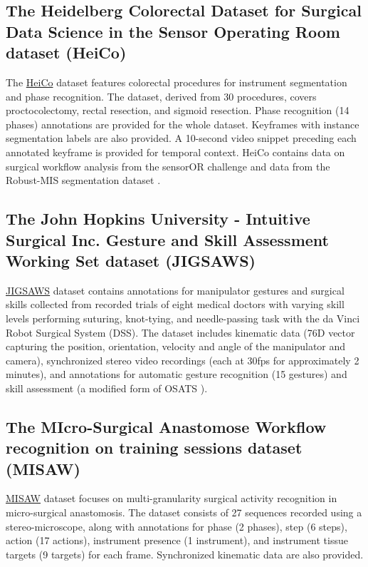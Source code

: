 \documentclass[times,twocolumn,final]{elsarticle}
\begin{document}
\subsection{The Heidelberg Colorectal Dataset for Surgical Data Science in the Sensor Operating Room dataset (HeiCo)}
The \href{https://www.synapse.org/#!Synapse:syn21903917/wiki/601992}{HeiCo} \citep{heico} dataset features colorectal procedures for instrument segmentation and phase recognition. The dataset, derived from 30 procedures, covers proctocolectomy, rectal resection, and sigmoid resection. Phase recognition (14 phases) annotations are provided for the whole dataset. Keyframes with instance segmentation labels are also provided. A 10-second video snippet preceding each annotated keyframe is provided for temporal context. HeiCo contains data on surgical workflow analysis from the sensorOR challenge \citep{heico} and data from the Robust-MIS segmentation dataset \citep{robustmis2019}. 



\subsection{The John Hopkins University - Intuitive Surgical Inc. Gesture and Skill Assessment Working Set dataset (JIGSAWS)}
\href{https://cirl.lcsr.jhu.edu/research/hmm/datasets/jigsaws_release/}{JIGSAWS} dataset \citep{jigsaws} contains annotations for manipulator gestures and surgical skills collected from recorded trials of eight medical doctors with varying skill levels performing suturing, knot-tying, and needle-passing task with the da Vinci Robot Surgical System (DSS). The dataset includes kinematic data (76D vector capturing the position, orientation, velocity and angle of the manipulator and camera), synchronized stereo video recordings (each at 30fps for approximately 2 minutes), and annotations for automatic gesture recognition (15 gestures) and skill assessment (a modified form of OSATS \citep{osats}). 


\subsection{The MIcro-Surgical Anastomose Workflow recognition on training sessions dataset (MISAW)}
\href{https://www.synapse.org/#!Synapse:syn21776936/wiki/601700}{MISAW} dataset \citep{huaulme2021micro} focuses on multi-granularity surgical activity recognition in micro-surgical anastomosis. The dataset consists of 27 sequences recorded using a stereo-microscope, along with annotations for phase (2 phases), step (6 steps), action (17 actions), instrument presence (1 instrument), and instrument tissue targets (9 targets) for each frame. Synchronized kinematic data are also provided.
\end{document}
